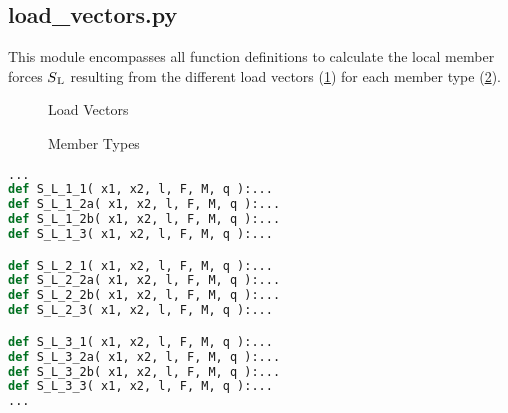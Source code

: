 \subsection{load\_vectors.py}
\label{subsec:loadvectors.py}

This module encompasses all function definitions to calculate the local member forces $S\textsubscript{L}$ \cite[4.2-4.11]{schneider} resulting from the different load vectors (\cref{fig:loadVec}) for each member type (\cref{fig:memberTypes}).


\begin{figure}[h]%
    \centering
    \qquad

    \centering
    
    \caption{Load Vectors}%
    \label{fig:loadVec}%
\end{figure}


\begin{figure}[h]%
    \centering
    \qquad

    \centering
    \qquad
    
    \caption{Member Types}%
    \label{fig:memberTypes}%
\end{figure}

\begin{inconsolata}
\begin{minipage}{\linewidth}
\begin{lstlisting}[language=python]
...
def S_L_1_1( x1, x2, l, F, M, q ):...
def S_L_1_2a( x1, x2, l, F, M, q ):...
def S_L_1_2b( x1, x2, l, F, M, q ):...
def S_L_1_3( x1, x2, l, F, M, q ):...

def S_L_2_1( x1, x2, l, F, M, q ):...
def S_L_2_2a( x1, x2, l, F, M, q ):...
def S_L_2_2b( x1, x2, l, F, M, q ):...
def S_L_2_3( x1, x2, l, F, M, q ):...

def S_L_3_1( x1, x2, l, F, M, q ):...
def S_L_3_2a( x1, x2, l, F, M, q ):...
def S_L_3_2b( x1, x2, l, F, M, q ):...
def S_L_3_3( x1, x2, l, F, M, q ):...
...
\end{lstlisting}
\end{minipage}
\end{inconsolata}

